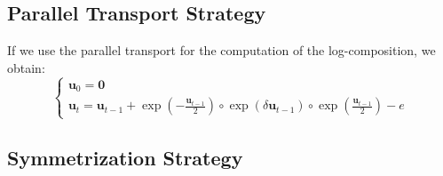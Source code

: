 \subsection{Parallel Transport Strategy}

If we use the parallel transport for the computation of the log-composition, we obtain:
\begin{equation}\label{eq:parallel_strategy}
\begin{cases}
\mathbf{u}_0 = \mathbf{0} \\
\mathbf{u}_{t} = \mathbf{u}_{t-1} + \exp(-\frac{\mathbf{u}_{t-1}}{2}) \circ \exp(\delta \mathbf{u}_{t-1}) \circ \exp(\frac{\mathbf{u}_{t-1}}{2}) - e
\end{cases}
\end{equation}

\subsection{Symmetrization Strategy}

